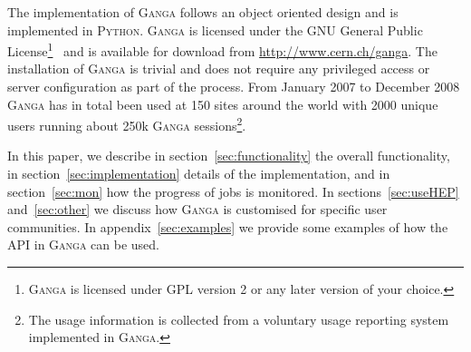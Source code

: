 \documentclass{elsart}
\def\ganga {\textsc{Ganga}\xspace}
\def\python {\textsc{Python}\xspace}
\begin{document}
The implementation of \ganga follows an object oriented design and is
implemented in \python. \ganga is licensed under the GNU General Public
License\footnote{\ganga is licensed under GPL version 2 or any later version
  of your choice.}~\cite{GPL} and is available for download from
\url{http://www.cern.ch/ganga}. The installation of \ganga is trivial and
does not require any privileged access or server configuration as part of the
process. From January 2007 to December 2008 \ganga has in total been
used at 150 sites around the world with 2000 unique users running about 250k %
\ganga sessions\footnote{The usage information is collected from a voluntary
  usage reporting system implemented in \ganga.}.

In this paper, we describe in section~\ref{sec:functionality} the overall
functionality, in section~\ref{sec:implementation} details of the
implementation, and in section~\ref{sec:mon} how the progress of jobs is
monitored. In sections~\ref{sec:useHEP} and~\ref{sec:other} we discuss how
\ganga is customised for specific user communities. In
appendix~\ref{sec:examples} we provide some examples of how the API in \ganga
can be used.
\end{document}

